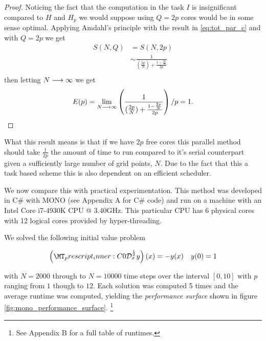 \begin{proof}
Noticing the fact that the computation in the task $ I $ is insignificant compared to $ H $ and $ H_p $ we would suppose using $ Q = 2p $ cores would be in some sense optimal. Applying Amdahl's principle with the result in \ref{eq:tot_par_c} and with $ Q = 2p $ we get 
\begin{align}
    S(N, Q) &= S(N, 2p) \\
    &\sim \frac{1}{(\frac{2p}{N}) + \frac{1-\frac{2p}{N}}{2p} } \\
\end{align}
then letting $ N \longrightarrow \infty $ we get
\begin{align}
    E(p) = \lim_{N \longrightarrow \infty} \left(\frac{1}{(\frac{2p}{N}) + \frac{1-\frac{2p}{N}}{2p} } \right) \slash p = 1.
\end{align}

\end{proof}

What this result means is that if we have $ 2p $ free cores this parallel method should take $ \frac{1}{2p} $ the amount of time to run compared to it's serial counterpart given a sufficiently large number of grid points, $N$. Due to the fact that this a task based scheme this is also dependent on an efficient scheduler.

We now compare this with practical experimentation. This method was developed in C\# with MONO (see Appendix A for C\# code) and run on a machine with an Intel \textregistered Core \texttrademark{} i7-4930K CPU @ 3.40GHz. This particular CPU has 6 physical cores with 12 logical cores provided by hyper-threading. 

We solved the following initial value problem

\begin{align}
    \capder{0}{x}{\frac{1}{2}}{y}(x) = -y(x) & & y(0) = 1
\end{align}

with $ N = 2000 $ through to $ N = 10000 $ time steps over the interval $ [0,10] $ with $ p $ ranging from $ 1 $ though to $ 12 $. Each solution was computed 5 times and the average runtime  was computed, yielding the \emph{performance surface} shown in figure \ref{fig:mono_performance_surface}. \footnote{See Appendix B for a full table of runtimes.}

